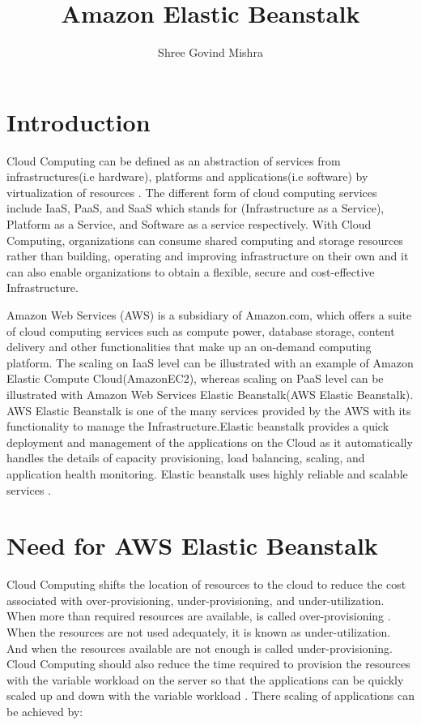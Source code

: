 \documentclass[9pt,twocolumn,twoside]{styles/osajnl}
\title{Amazon Elastic Beanstalk}
\author[1]{Shree Govind Mishra}
\affil[1]{School of Informatics and Computing, Bloomington, IN 47408, U.S.A.}
\affil[*]{Corresponding authors: shremish@indiana.edu}
\begin{document}
\maketitle

\section{Introduction}

Cloud Computing can be defined as an abstraction of services from
infrastructures(i.e hardware), platforms and applications(i.e
software) by virtualization of resources \cite{elastic-beanstalk}. The
different form of cloud computing services include IaaS, PaaS, and
SaaS which stands for (Infrastructure as a Service), Platform as a
Service, and Software as a service respectively. With Cloud
Computing, organizations can consume shared computing and storage
resources rather than building, operating and improving infrastructure
on their own and it can also enable organizations to obtain a
flexible, secure and cost-effective Infrastructure.

Amazon Web Services (AWS) is a subsidiary of Amazon.com, which offers
a suite of cloud computing services such as compute power, database
storage, content delivery and other functionalities that make up an
on-demand computing platform. The scaling on IaaS level can be
illustrated with an example of Amazon Elastic Compute
Cloud(AmazonEC2), whereas scaling on PaaS level can be illustrated
with Amazon Web Services Elastic Beanstalk(AWS Elastic Beanstalk). AWS
Elastic Beanstalk is one of the many services provided by the AWS
with its functionality to manage the Infrastructure.Elastic beanstalk
provides a quick deployment and management of the applications on the
Cloud as it automatically handles the details of capacity
provisioning, load balancing, scaling, and application health
monitoring. Elastic beanstalk uses highly reliable and scalable
services \cite{elastic-beanstalk-2}.

\section{Need for AWS Elastic Beanstalk}

Cloud Computing shifts the location of resources to the cloud to
reduce the cost associated with over-provisioning, under-provisioning,
and under-utilization. When more than required resources are
available, is called over-provisioning \cite{cloudcomputing}. When the
resources are not used adequately, it is known as
under-utilization. And when the resources available are not enough is
called under-provisioning. Cloud Computing should also reduce the time
required to provision the resources with the variable workload on the
server so that the applications can be quickly scaled up and down with
the variable workload \cite{elastic-beanstalk-book}. There scaling of
applications can be achieved by:
\end{document}
